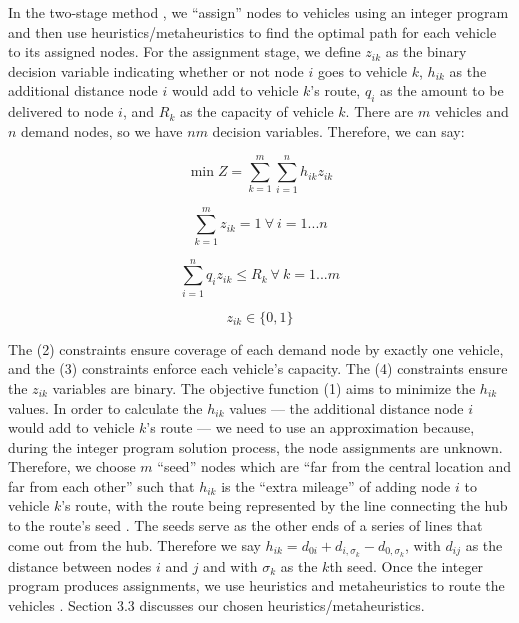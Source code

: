 \documentclass[11pt]{article}
\begin{document}
In the two-stage method \cite{intro_logistics_book}, we ``assign'' nodes to vehicles using an integer program and then use heuristics/metaheuristics to find the optimal path for each vehicle to its assigned nodes.  For the assignment stage, we define $z_{ik}$ as the binary decision variable indicating whether or not node $i$ goes to vehicle $k$, $h_{ik}$ as the additional distance node $i$ would add to vehicle $k$'s route, $q_{i}$ as the amount to be delivered to node $i$, and $R_{k}$ as the capacity of vehicle $k$.  There are $m$ vehicles and $n$ demand nodes, so we have $nm$ decision variables.  Therefore, we can say:

\begin{equation}
\min Z = \sum\limits_{k=1}^{m} \sum\limits_{i=1}^{n} h_{ik} z_{ik}
\end{equation}

\begin{equation}
\sum\limits_{k=1}^{m} z_{ik} = 1\ \forall\ i=1...n 
\end{equation}

\begin{equation}
\sum\limits_{i=1}^{n} q_{i} z_{ik} \leq R_{k}\ \forall\ k = 1...m
\end{equation}

\begin{equation}
z_{ik} \in \{0,1\}
\end{equation}

\noindent The (2) constraints ensure coverage of each demand node by exactly one vehicle, and the (3) constraints enforce each vehicle's capacity.  The (4) constraints ensure the $z_{ik}$ variables are binary. The objective function (1) aims to minimize the $h_{ik}$ values. In order to calculate the $h_{ik}$ values --- the additional distance node $i$ would add to vehicle $k$'s route --- we need to use an approximation because, during the integer program solution process, the node assignments are unknown.  Therefore, we choose $m$ ``seed'' nodes which are ``far from the central location and far from each other'' such that $h_{ik}$ is the ``extra mileage'' of adding node $i$ to vehicle $k$'s route, with the route being represented by the line connecting the hub to the route's seed \cite{intro_logistics_book}.  The seeds serve as the other ends of a series of lines that come out from the hub.  Therefore we say $h_{ik} = d_{0i} + d_{i,\sigma_{k}} - d_{0,\sigma_{k}}$, with $d_{ij}$ as the distance between nodes $i$ and $j$ and with $\sigma_{k}$ as the $k$th seed.  Once the integer program produces assignments, we use heuristics and metaheuristics to route the vehicles \cite{intro_logistics_book}. Section 3.3 discusses our chosen heuristics/metaheuristics.
\end{document}
